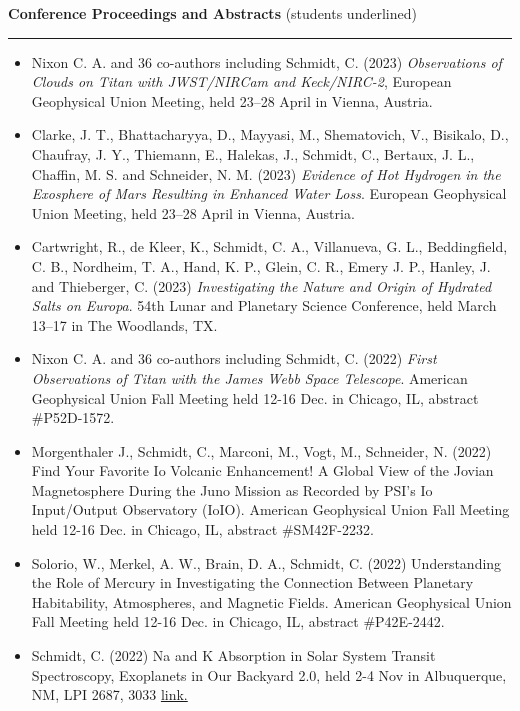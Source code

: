 \documentclass[12pt]{report}
\begin{document}
\vspace{2 mm}
\noindent\textbf{Conference Proceedings and Abstracts} (students underlined) \rm\hspace*{\fill} \\
\rule{\textwidth}{1pt}
 \begin{itemize} \itemsep -2pt %
   \item Nixon C. A. and 36 co-authors including Schmidt, C. (2023) \textit{Observations of Clouds on Titan with JWST/NIRCam and Keck/NIRC-2}, European Geophysical Union Meeting, held 23–28 April in Vienna, Austria.
   \item Clarke, J. T., Bhattacharyya, D., Mayyasi, M., Shematovich, V., Bisikalo, D., Chaufray, J. Y., Thiemann, E., Halekas, J., Schmidt, C., Bertaux, J. L., Chaffin, M. S. and Schneider, N. M. (2023) \textit{Evidence of Hot Hydrogen in the Exosphere of Mars Resulting in Enhanced Water Loss}. European Geophysical Union Meeting, held 23–28 April in Vienna, Austria.
   \item Cartwright, R., de Kleer, K., Schmidt, C. A., Villanueva, G. L., Beddingfield, C. B., Nordheim, T. A., Hand, K. P., Glein, C. R., Emery J. P., Hanley, J. and Thieberger, C. (2023) \textit{Investigating the Nature and Origin of Hydrated Salts on Europa}. 54th Lunar and Planetary Science Conference, held March 13–17 in The Woodlands, TX. 
   \item Nixon C. A. and 36 co-authors including Schmidt, C. (2022) \textit{First Observations of Titan with the James Webb Space Telescope}.  American Geophysical Union Fall Meeting held 12-16 Dec. in Chicago, IL, abstract \#P52D-1572.
   \item Morgenthaler J., Schmidt, C., Marconi, M., Vogt, M., Schneider, N. (2022) Find Your Favorite Io Volcanic Enhancement! A Global View of the Jovian Magnetosphere During the Juno Mission as Recorded by PSI's Io Input/Output Observatory (IoIO). American Geophysical Union Fall Meeting held 12-16 Dec. in Chicago, IL, abstract \#SM42F-2232.
   \item Solorio, W., Merkel, A. W., Brain, D. A., Schmidt, C. (2022) Understanding the Role of Mercury in Investigating the Connection Between Planetary Habitability, Atmospheres, and Magnetic Fields. American Geophysical Union Fall Meeting held 12-16 Dec. in Chicago, IL, abstract \#P42E-2442.
   \item Schmidt, C. (2022) Na and K Absorption in Solar System Transit Spectroscopy, Exoplanets in Our Backyard 2.0, held 2-4 Nov in Albuquerque, NM, LPI 2687, 3033 \href{https://www.hou.usra.edu/meetings/exoplanets2022/pdf/3033.pdf}{link.} 

\end{itemize}
\end{document}
